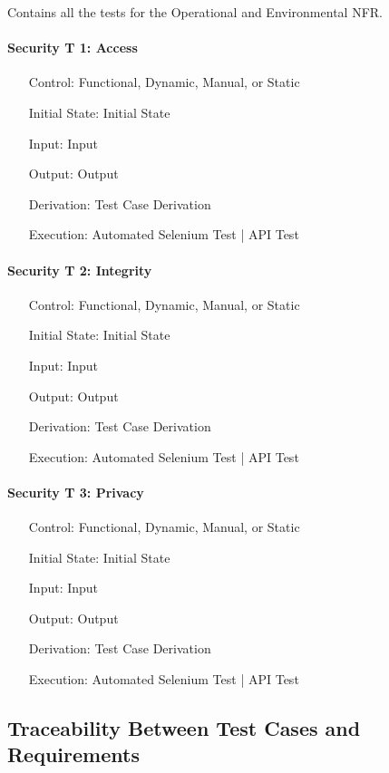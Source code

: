 \documentclass[12pt, titlepage]{article}
\begin{document}
Contains all the tests for the Operational and Environmental NFR.

\paragraph*{Security T 1: Access}
\begin{itemize}
	\item[Control:] Functional, Dynamic, Manual, or Static
	\item[Initial State:] Initial State
	\item[Input:] Input
	\item[Output:] Output
	\item[Derivation:] Test Case Derivation
	\item[Execution:] Automated Selenium Test | API Test
\end{itemize}

\paragraph*{Security T 2: Integrity}
\begin{itemize}
	\item[Control:] Functional, Dynamic, Manual, or Static
	\item[Initial State:] Initial State
	\item[Input:] Input
	\item[Output:] Output
	\item[Derivation:] Test Case Derivation
	\item[Execution:] Automated Selenium Test | API Test
\end{itemize}

\paragraph*{Security T 3: Privacy}
\begin{itemize}
	\item[Control:] Functional, Dynamic, Manual, or Static
	\item[Initial State:] Initial State
	\item[Input:] Input
	\item[Output:] Output
	\item[Derivation:] Test Case Derivation
	\item[Execution:] Automated Selenium Test | API Test
\end{itemize}

\subsection{Traceability Between Test Cases and Requirements}
\end{document}
